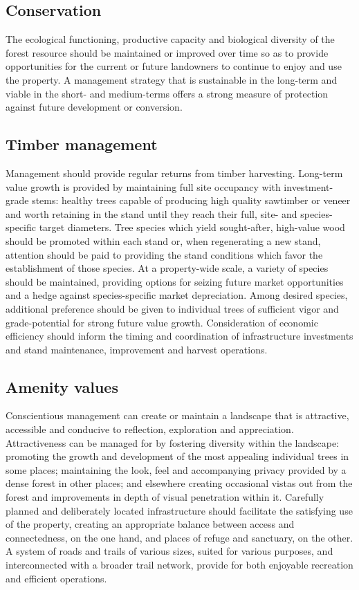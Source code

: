 \documentclass[]{tufte-handout}
\begin{document}
\subsection{Conservation}\label{conservation}

The ecological functioning, productive capacity and biological diversity
of the forest resource should be maintained or improved over time so as
to provide opportunities for the current or future landowners to
continue to enjoy and use the property. A management strategy that is
sustainable in the long-term and viable in the short- and medium-terms
offers a strong measure of protection against future development or
conversion.

\subsection{Timber management}\label{timber-management}

Management should provide regular returns from timber harvesting.
Long-term value growth is provided by maintaining full site occupancy
with investment-grade stems: healthy trees capable of producing high
quality sawtimber or veneer and worth retaining in the stand until they
reach their full, site- and species-specific target diameters. Tree
species which yield sought-after, high-value wood should be promoted
within each stand or, when regenerating a new stand, attention should be
paid to providing the stand conditions which favor the establishment of
those species. At a property-wide scale, a variety of species should be
maintained, providing options for seizing future market opportunities
and a hedge against species-specific market depreciation. Among desired
species, additional preference should be given to individual trees of
sufficient vigor and grade-potential for strong future value growth.
Consideration of economic efficiency should inform the timing and
coordination of infrastructure investments and stand maintenance,
improvement and harvest operations.

\subsection{Amenity values}\label{amenity-values}

Conscientious management can create or maintain a landscape that is
attractive, accessible and conducive to reflection, exploration and
appreciation. Attractiveness can be managed for by fostering diversity
within the landscape: promoting the growth and development of the most
appealing individual trees in some places; maintaining the look, feel
and accompanying privacy provided by a dense forest in other places; and
elsewhere creating occasional vistas out from the forest and
improvements in depth of visual penetration within it. Carefully planned
and deliberately located infrastructure should facilitate the satisfying
use of the property, creating an appropriate balance between access and
connectedness, on the one hand, and places of refuge and sanctuary, on
the other. A system of roads and trails of various sizes, suited for
various purposes, and interconnected with a broader trail network,
provide for both enjoyable recreation and efficient operations.
\end{document}
